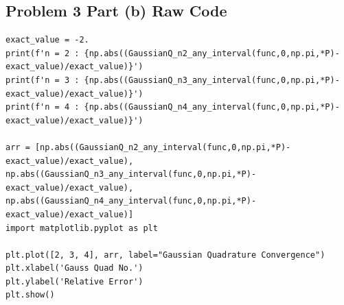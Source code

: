 \documentclass{article}
\begin{document}
\subsection{Problem 3 Part (b) Raw Code}\label{appendix:b}
\begin{verbatim}
exact_value = -2.
print(f'n = 2 : {np.abs((GaussianQ_n2_any_interval(func,0,np.pi,*P)-exact_value)/exact_value)}')
print(f'n = 3 : {np.abs((GaussianQ_n3_any_interval(func,0,np.pi,*P)-exact_value)/exact_value)}')
print(f'n = 4 : {np.abs((GaussianQ_n4_any_interval(func,0,np.pi,*P)-exact_value)/exact_value)}')

arr = [np.abs((GaussianQ_n2_any_interval(func,0,np.pi,*P)-exact_value)/exact_value), np.abs((GaussianQ_n3_any_interval(func,0,np.pi,*P)-exact_value)/exact_value), np.abs((GaussianQ_n4_any_interval(func,0,np.pi,*P)-exact_value)/exact_value)]
import matplotlib.pyplot as plt

plt.plot([2, 3, 4], arr, label="Gaussian Quadrature Convergence")
plt.xlabel('Gauss Quad No.')
plt.ylabel('Relative Error')
plt.show()
\end{verbatim}
\end{document}
